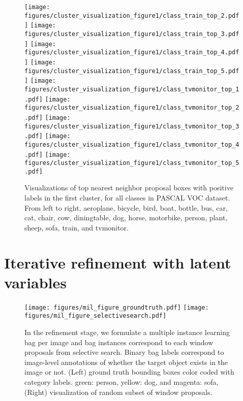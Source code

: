 \documentclass{article}
\begin{document}
\begin{figure*}[htbp]
\texttt{[image: figures/cluster\_visualization\_figure1/class\_train\_top\_2.pdf]}\hspace{-0.12cm}
\texttt{[image: figures/cluster\_visualization\_figure1/class\_train\_top\_3.pdf]}\hspace{-0.12cm}
\texttt{[image: figures/cluster\_visualization\_figure1/class\_train\_top\_4.pdf]}\hspace{-0.12cm}
\texttt{[image: figures/cluster\_visualization\_figure1/class\_train\_top\_5.pdf]}\hspace{0.2cm}
\texttt{[image: figures/cluster\_visualization\_figure1/class\_tvmonitor\_top\_1.pdf]}\hspace{-0.12cm}
\texttt{[image: figures/cluster\_visualization\_figure1/class\_tvmonitor\_top\_2.pdf]}\hspace{-0.12cm}
\texttt{[image: figures/cluster\_visualization\_figure1/class\_tvmonitor\_top\_3.pdf]}\hspace{-0.12cm}
\texttt{[image: figures/cluster\_visualization\_figure1/class\_tvmonitor\_top\_4.pdf]}\hspace{-0.12cm}
\texttt{[image: figures/cluster\_visualization\_figure1/class\_tvmonitor\_top\_5.pdf]}\\
\caption{Visualizations of top  nearest neighbor proposal boxes with positive labels in the first cluster,  for all  classes in PASCAL VOC dataset. From left to right, aeroplane, bicycle, bird, boat, bottle, bus, car, cat, chair, cow, diningtable, dog, horse, motorbike, person, plant, sheep, sofa, train, and tvmonitor.} 
\label{fig:cluster_visualization_figure} 
\end{figure*}

\section{Iterative refinement with latent variables}
\label{sec:slsvm}

\begin{figure*}[htbp]
\centering
\texttt{[image: figures/mil\_figure\_groundtruth.pdf]} \hspace{0.1cm}
\texttt{[image: figures/mil\_figure\_selectivesearch.pdf]}
\caption{In the refinement stage, we formulate a multiple instance learning bag per image and bag instances correspond to each window proposals from selective search.  Binary bag labels correspond to image-level annotations of whether the target object exists in the image or not. (Left) ground truth bounding boxes color coded with category labels. green: person, yellow: dog, and magenta: sofa, (Right) visualization of  random subset of window proposals.} 
\label{fig:mil-figure} 
\end{figure*}
\end{document}
